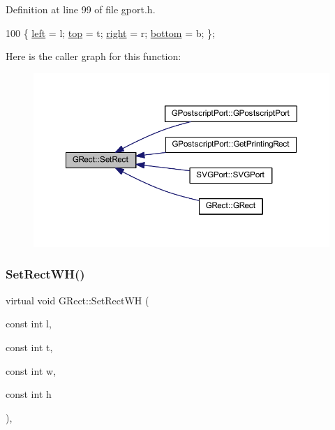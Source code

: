 Definition at line 99 of file gport.\+h.


\begin{DoxyCode}
100         \{ \mbox{\hyperlink{class_g_rect_ab848c49d0c6376f749a592042791b98b}{left}} = l; \mbox{\hyperlink{class_g_rect_af22c8a22a7d2fe0f139375e7eb171675}{top}} = t; \mbox{\hyperlink{class_g_rect_a361868c6c368e642abcaf3e4823b1e70}{right}} = r; \mbox{\hyperlink{class_g_rect_a767f1eb55f7e9880f58609406b2d6a66}{bottom}} = b; \};
\end{DoxyCode}
Here is the caller graph for this function\+:\nopagebreak
\begin{figure}[H]
\begin{center}
\leavevmode
\includegraphics[width=350pt]{class_g_rect_a1fd6fd632b6d3c068382766a0c18340f_icgraph}
\end{center}
\end{figure}
\mbox{\label{class_g_rect_a6adcf2d50d9aaeaf18c304dc3ece0280}} 
\subsubsection{\texorpdfstring{Set\+Rect\+W\+H()}{SetRectWH()}}
{\footnotesize\ttfamily virtual void G\+Rect\+::\+Set\+Rect\+WH (\begin{DoxyParamCaption}\item[{const int}]{l,  }\item[{const int}]{t,  }\item[{const int}]{w,  }\item[{const int}]{h }\end{DoxyParamCaption})\hspace{0.3cm}{\ttfamily [inline]}, {\ttfamily [virtual]}}



